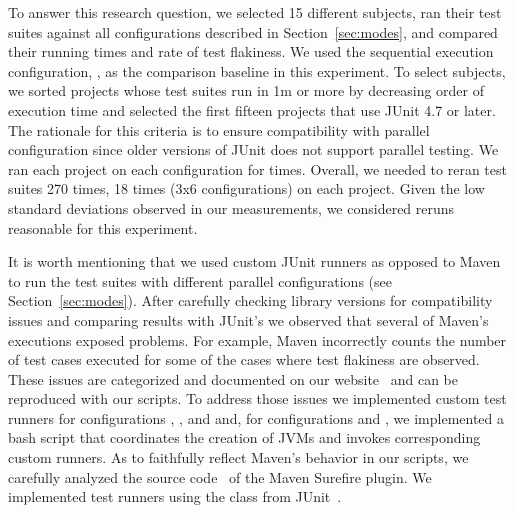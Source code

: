To answer this research question, we selected 15 different subjects,
ran their test suites against all configurations described in
Section~\ref{sec:modes}, and compared their running times and rate of
test flakiness.  We used the sequential execution configuration,
\emph{\Seq{}}, as the comparison baseline in this experiment.  To
select subjects, we sorted projects whose test suites run in 1m or
more by decreasing order of execution time and selected the first
fifteen projects that use JUnit 4.7 or later.  The rationale for this
criteria is to ensure compatibility with parallel configuration since
older versions of JUnit does not support parallel testing.  We ran
each project on each configuration for \SubjectsReruns{} times.
Overall, we needed to reran test suites 270 times, 18 times (3x6
configurations) on each project.  Given the low standard deviations
observed in our measurements, we considered \SubjectsReruns{} reruns reasonable for this
experiment.

It is worth mentioning that we used custom JUnit runners as opposed to
Maven to run the test suites with different parallel configurations
(see Section~\ref{sec:modes}).  After carefully checking library
versions for compatibility issues and comparing results with JUnit's
we observed that several of Maven's executions exposed problems.  For
example, Maven incorrectly counts the number of test cases executed
for some of the cases where test flakiness are observed. These issues are
categorized and documented on our website~\cite{ourwebpage} and can be
reproduced with our scripts.  To address those issues we implemented
custom test runners for configurations \emph{\SeqClassParMeth{}},
\emph{\ParClassSeqMeth{}}, and \emph{\ParClassParMeth{}} and,  for configurations
\emph{\ForkSeq{}} and \emph{\ForkParMeth{}}, we
implemented a bash script that coordinates the creation of JVMs and
invokes corresponding custom runners.  As to faithfully reflect
Maven's behavior in our scripts, we carefully analyzed the source
code~\cite{maven-surefire-source} of the Maven Surefire plugin. We
implemented test runners using the  class from
JUnit~\cite{junit-parallel}.  

